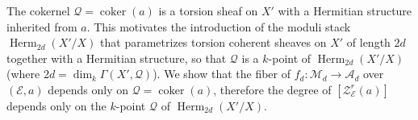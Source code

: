 \documentclass[reqno]{amsart}
\numberwithin{equation}{section}
\DeclareMathOperator{\coker}{coker}
\DeclareMathOperator{\Sht}{Sht}
\DeclareMathOperator{\Herm}{Herm}
\DeclareMathOperator{\Lagr}{Lagr}
\newcommand\cA{\mathcal{A}}
\newcommand\cE{\mathcal{E}}
\newcommand\cF{\mathcal{F}}
\newcommand\cM{\mathcal{M}}
\newcommand\cQ{\mathcal{Q}}
\newcommand\cZ{\mathcal{Z}}
\theoremstyle{remark}
\numberwithin{equation}{section}
\begin{document}

The cokernel $\cQ=\coker(a)$ is a torsion sheaf on $X'$ with a Hermitian structure inherited from $a$. This motivates the introduction of the moduli stack $\Herm_{2d}(X'/X)$ that parametrizes torsion coherent sheaves on $X'$ of length $2d$ together with a Hermitian structure, so that $\cQ$ is a $k$-point of $\Herm_{2d}(X'/X)$ (where $2d=\dim_{k}\Gamma(X',\cQ)$). We show that the fiber of $f_{d}:\cM_{d}\to \cA_{d}$ over $(\cE,a)$ depends only on $\cQ=\coker(a)$, therefore the degree of $[\cZ^{r}_{\cE}(a)]$ depends only on the $k$-point $\cQ$ of $\Herm_{2d}(X'/X)$.




\end{document}
